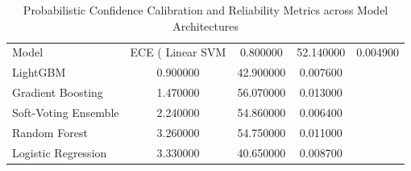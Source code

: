 \begin{table}
\caption{Probabilistic Confidence Calibration and Reliability Metrics across Model Architectures}
\label{tab:confidence_calibration}
\begin{tabular}{lccc}
\toprule
Model & ECE (%
\midrule
Linear SVM & 0.800000 & 52.140000 & 0.004900 \\
LightGBM & 0.900000 & 42.900000 & 0.007600 \\
Gradient Boosting & 1.470000 & 56.070000 & 0.013000 \\
Soft-Voting Ensemble & 2.240000 & 54.860000 & 0.006400 \\
Random Forest & 3.260000 & 54.750000 & 0.011000 \\
Logistic Regression & 3.330000 & 40.650000 & 0.008700 \\
\bottomrule
\end{tabular}
\end{table}
